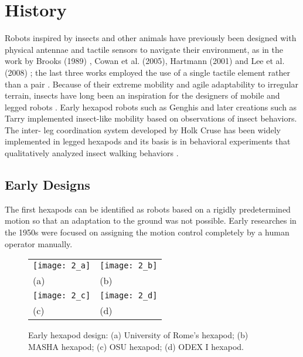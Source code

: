 \section{History} 
Robots inspired by insects and other animals have previously been designed with physical antennae and tactile sensors to navigate their environment, as in the work by Brooks (1989) \cite{20,22}, Cowan et al. (2005), Hartmann (2001) \cite{27} and Lee et al. (2008) \cite{10}; the last three works employed the use of a single tactile element rather than a pair \cite{13}.
Because of their extreme mobility and agile adaptability to irregular terrain, insects have long been an inspiration for the designers of mobile and legged robots \cite{11,14}. Early hexapod robots such as Genghis and later creations such as Tarry implemented insect-like mobility based on observations of insect behaviors. The inter- leg coordination system developed by Holk Cruse \cite{30,23}  has been widely implemented   in legged hexapods and its basis is in behavioral experiments that qualitatively analyzed insect walking behaviors \cite{18}.

\subsection{Early Designs}
The first hexapods can be identified as robots based on a rigidly predetermined motion so that
an adaptation to the ground was not possible. Early researches in the 1950s were focused on assigning the motion control completely by a human operator manually\cite{11h}. 
\begin{figure}[h]
    \centering
    \begin{tabular}{ l l }
        \texttt{[image: 2\_a]} & \texttt{[image: 2\_b]} \\ 
        \hspace{3.5cm}(a) & \hspace{3.3cm}(b)\\
        \texttt{[image: 2\_c]} & \hspace{2cm} \texttt{[image: 2\_d]} \\ 
        \hspace{3.5cm}(c) & \hspace{3.3cm}(d)\\
    \end{tabular}
    \caption{Early hexapod design: (a) University of Rome’s hexapod; (b) MASHA hexapod; (c) OSU hexapod; (d) ODEX I hexapod.}
    \label{fig2}
\end{figure}

